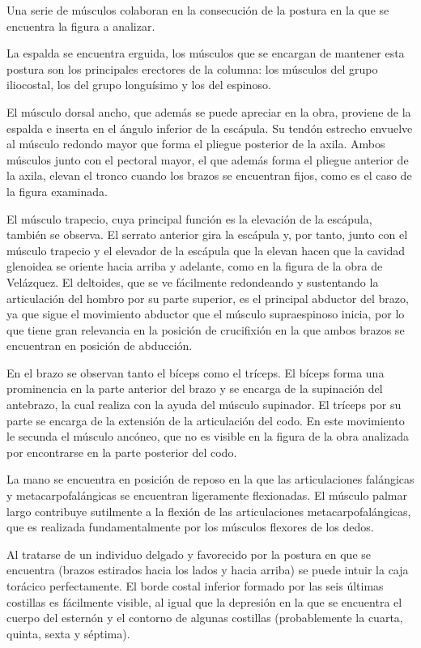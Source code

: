 Una serie de músculos colaboran en la consecución de la postura en la que se encuentra la figura a analizar.

La espalda se encuentra erguida, los músculos que se encargan de mantener esta postura son los principales erectores de la columna: los músculos del grupo iliocostal, los del grupo longuísimo y los del espinoso.

El músculo dorsal ancho, que además se puede apreciar en la obra, proviene de la espalda e inserta en el ángulo inferior de la escápula. Su tendón estrecho envuelve al músculo redondo mayor que forma el pliegue posterior de la axila. Ambos músculos junto con el pectoral mayor, el que además forma el pliegue anterior de la axila, elevan el tronco cuando los brazos se encuentran fijos, como es el caso de la figura examinada.

El músculo trapecio, cuya principal función es la elevación de la escápula, también se observa. El serrato anterior gira la escápula y, por tanto, junto con el músculo trapecio y el elevador de la escápula que la elevan hacen que la cavidad glenoidea se oriente hacia arriba y adelante, como en la figura de la obra de Velázquez.
El deltoides, que se ve fácilmente redondeando y sustentando la articulación del hombro por su parte superior, es el principal abductor del brazo, ya que sigue el movimiento abductor que el músculo supraespinoso inicia, por lo que tiene gran relevancia en la posición de crucifixión en la que ambos brazos se encuentran en posición de abducción.

En el brazo se observan tanto el bíceps como el tríceps. El bíceps forma una prominencia en la parte anterior del brazo y se encarga de la supinación del antebrazo, la cual realiza con la ayuda del músculo supinador. El tríceps por su parte se encarga de la extensión de la articulación del codo. En este movimiento le secunda el músculo ancóneo, que no es visible en la figura de la obra analizada por encontrarse en la parte posterior del codo.

La mano se encuentra en posición de reposo en la que las articulaciones falángicas y metacarpofalángicas se encuentran ligeramente flexionadas. El músculo palmar largo contribuye sutilmente a la flexión de las articulaciones metacarpofalángicas, que es realizada fundamentalmente por los músculos flexores de los dedos.

Al tratarse de un individuo delgado y favorecido por la postura en que se encuentra (brazos estirados hacia los lados y hacia arriba) se puede intuir la caja torácico perfectamente. El borde costal inferior formado por las seis últimas costillas es fácilmente visible, al igual que la depresión en la que se encuentra el cuerpo del esternón y el contorno de algunas costillas (probablemente la cuarta, quinta, sexta y séptima).

